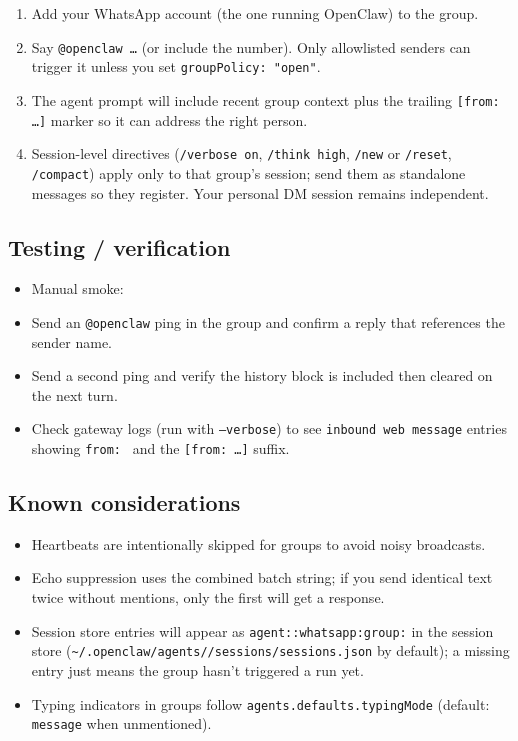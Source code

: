 \begin{enumerate}
  \item Add your WhatsApp account (the one running OpenClaw) to the group.
  \item Say \texttt{@openclaw …} (or include the number). Only allowlisted senders can trigger it unless you set \texttt{groupPolicy: "open"}.
  \item The agent prompt will include recent group context plus the trailing \texttt{[from: …]} marker so it can address the right person.
  \item Session-level directives (\texttt{/verbose on}, \texttt{/think high}, \texttt{/new} or \texttt{/reset}, \texttt{/compact}) apply only to that group’s session; send them as standalone messages so they register. Your personal DM session remains independent.
\end{enumerate}


\subsection{Testing / verification}


\begin{itemize}
  \item Manual smoke:
  \item Send an \texttt{@openclaw} ping in the group and confirm a reply that references the sender name.
  \item Send a second ping and verify the history block is included then cleared on the next turn.
  \item Check gateway logs (run with \texttt{--verbose}) to see \texttt{inbound web message} entries showing \texttt{from: } and the \texttt{[from: …]} suffix.
\end{itemize}


\subsection{Known considerations}


\begin{itemize}
  \item Heartbeats are intentionally skipped for groups to avoid noisy broadcasts.
  \item Echo suppression uses the combined batch string; if you send identical text twice without mentions, only the first will get a response.
  \item Session store entries will appear as \texttt{agent::whatsapp:group:} in the session store (\texttt{\textasciitilde{}/.openclaw/agents//sessions/sessions.json} by default); a missing entry just means the group hasn’t triggered a run yet.
  \item Typing indicators in groups follow \texttt{agents.defaults.typingMode} (default: \texttt{message} when unmentioned).
\end{itemize}



